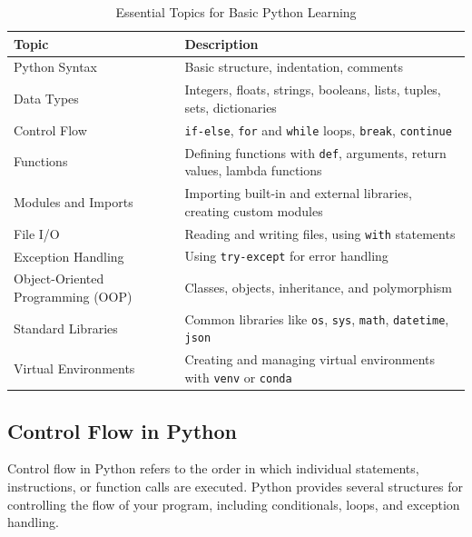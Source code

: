 \begin{table}[h!]
\centering
\begin{tabular}{|p{4cm}|p{8cm}|}
\hline
\textbf{Topic} & \textbf{Description} \\ \hline
Python Syntax & Basic structure, indentation, comments \\ \hline
Data Types & Integers, floats, strings, booleans, lists, tuples, sets, dictionaries \\ \hline
Control Flow & \texttt{if-else}, \texttt{for} and \texttt{while} loops, \texttt{break}, \texttt{continue} \\ \hline
Functions & Defining functions with \texttt{def}, arguments, return values, lambda functions \\ \hline
Modules and Imports & Importing built-in and external libraries, creating custom modules \\ \hline
File I/O & Reading and writing files, using \texttt{with} statements \\ \hline
Exception Handling & Using \texttt{try-except} for error handling \\ \hline
Object-Oriented Programming (OOP) & Classes, objects, inheritance, and polymorphism \\ \hline
Standard Libraries & Common libraries like \texttt{os}, \texttt{sys}, \texttt{math}, \texttt{datetime}, \texttt{json} \\ \hline
Virtual Environments & Creating and managing virtual environments with \texttt{venv} or \texttt{conda} \\ \hline
\end{tabular}
\caption{Essential Topics for Basic Python Learning}
\label{tab:basic_python_topics}
\end{table}

%
\subsection{Control Flow in Python}

Control flow in Python refers to the order in which individual statements, instructions, or function calls are executed. Python provides several structures for controlling the flow of your program, including conditionals, loops, and exception handling.

%
